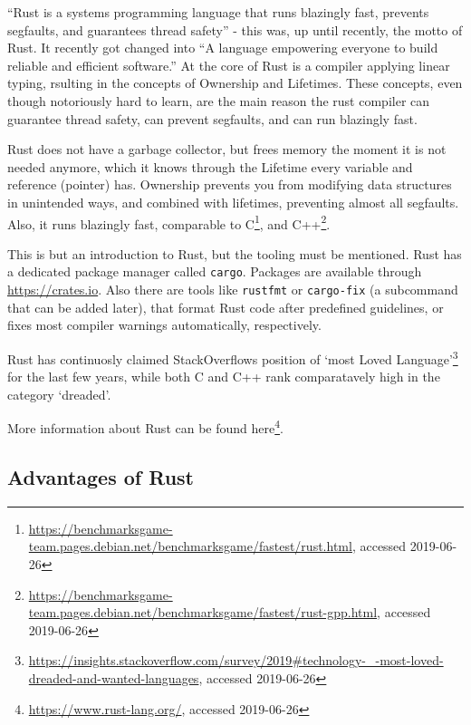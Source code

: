 ``Rust is a systems programming language that runs blazingly fast, prevents
segfaults, and guarantees thread safety'' - this was, up until recently, the
motto of Rust. It recently got changed into ``A language empowering everyone 
to build reliable and efficient software.'' At the core of Rust is a compiler
applying linear typing, rsulting in the concepts of Ownership and Lifetimes.
These concepts, even though notoriously hard to learn, are the main reason the
rust compiler can guarantee thread safety, can prevent segfaults, and can run
blazingly fast.




Rust does not have a garbage collector, but frees memory the moment it is not
needed anymore, which it knows through the Lifetime every variable and
reference (pointer) has. Ownership prevents you from modifying data structures
in unintended ways, and combined with lifetimes, preventing almost all
segfaults. Also, it runs blazingly fast, comparable to
C\footnote{\url{https://benchmarksgame-team.pages.debian.net/benchmarksgame/fastest/rust.html},
accessed 2019-06-26}, and
C++\footnote{\url{https://benchmarksgame-team.pages.debian.net/benchmarksgame/fastest/rust-gpp.html},
accessed 2019-06-26}.

This is but an introduction to Rust, but the tooling must be mentioned. Rust
has a dedicated package manager called \verb|cargo|. Packages are available
through \url{https://crates.io}. Also there are tools like \verb|rustfmt| or
\verb|cargo-fix| (a subcommand that can be added later), that format Rust code
after predefined guidelines, or fixes most compiler warnings automatically,
respectively.

Rust has continuosly claimed StackOverflows position of `most Loved
Language'\footnote{\url{https://insights.stackoverflow.com/survey/2019\#technology-\_-most-loved-dreaded-and-wanted-languages}, accessed 2019-06-26}
for the last few years, while both C and C++ rank comparatavely high in the
category `dreaded'.

More information about Rust can be found here\footnote{\url{https://www.rust-lang.org/}, accessed 2019-06-26}.


\subsection{Advantages of Rust}

